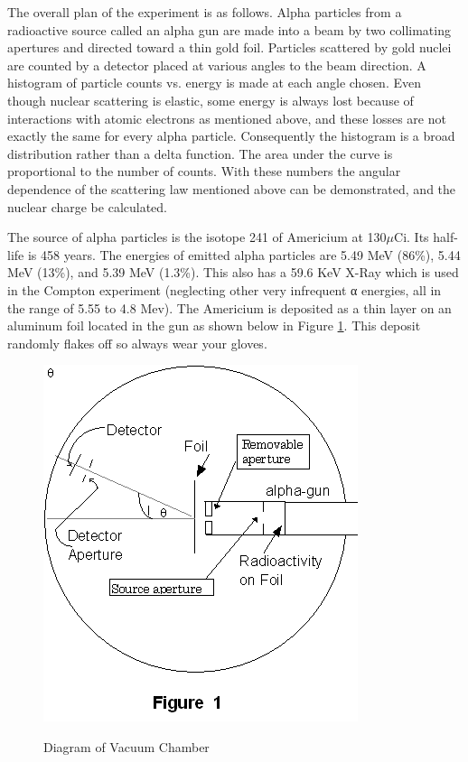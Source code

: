 \documentclass{../lab}
\begin{document}
The overall plan of the experiment is as follows. Alpha particles from a radioactive source called an alpha gun are made into a beam by two collimating apertures and directed toward a thin gold foil. Particles scattered by gold nuclei are counted by a detector placed at various angles to the beam direction. A histogram of particle counts vs. energy is made at each angle chosen. Even though nuclear scattering is elastic, some energy is always lost because of interactions with atomic electrons as mentioned above, and these losses are not exactly the same for every alpha particle. Consequently the histogram is a broad distribution rather than a delta function. The area under the curve is proportional to the number of counts. With these numbers the angular dependence of the scattering law mentioned above can be demonstrated, and the nuclear charge be calculated.

The source of alpha particles is the isotope 241 of Americium at 130$\mu$Ci. Its half-life is 458 years. The energies of emitted alpha particles are 5.49 MeV (86\%), 5.44 MeV (13\%), and 5.39 MeV (1.3\%). This also has a 59.6 KeV X-Ray which is used in the Compton experiment (neglecting other very infrequent α energies, all in the range of 5.55 to 4.8 Mev). The Americium is deposited as a thin layer on an aluminum foil located in the gun as shown below in Figure \ref{fig:DiagramOfVacuumChamber}. This deposit randomly flakes off so always wear your gloves.

\begin{figure}[h]
    \centering
    \href{http://experimentationlab.berkeley.edu/sites/default/files/images/RUTimage012.gif}{\includegraphics[width=0.5\linewidth]{images/RUTimage012.png}}
    \caption{Diagram of Vacuum Chamber}
    \label{fig:DiagramOfVacuumChamber}
\end{figure}
\end{document}
